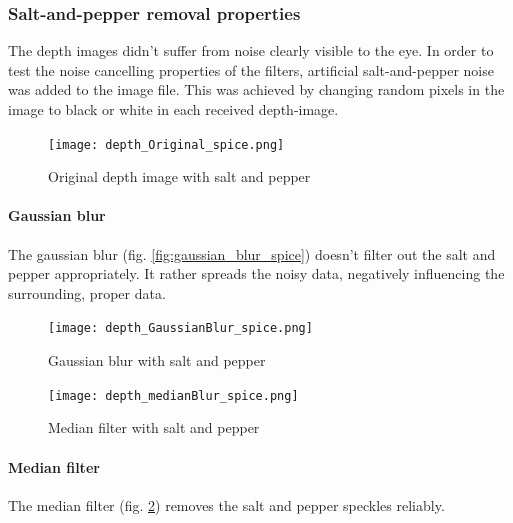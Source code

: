 \documentclass[DIV12,a4paper]{scrartcl}
\begin{document}
\newpage
\subsubsection{Salt-and-pepper removal properties}
\label{sec:grain_removal}
The depth images didn't suffer from noise clearly visible to the eye. In order to test the noise cancelling properties of the filters, artificial salt-and-pepper noise was added to the image file. This was achieved by changing random pixels in the image to black or white in each received depth-image. %
\par
\begin{figure}[h!tbp]
  \centering
  \texttt{[image: depth\_Original\_spice.png]}
  \caption{Original depth image with salt and pepper}
  \label{fig:original_depth_spice}
\end{figure}
\paragraph{Gaussian blur}
The gaussian blur (fig. \ref{fig:gaussian_blur_spice}) doesn't filter out the salt and pepper appropriately. It rather spreads the noisy data, negatively influencing the surrounding, proper data.
\begin{figure}[h!tbp]
  \centering
  \begin{minipage}{.5\textwidth}
    \centering
    \texttt{[image: depth\_GaussianBlur\_spice.png]}
    \caption{Gaussian blur with salt and pepper}
    \label{fig:gaussian_blur_spice}
  \end{minipage}%
  \begin{minipage}{.5\textwidth}
    \centering
    \texttt{[image: depth\_medianBlur\_spice.png]}
    \caption{Median filter with salt and pepper}
    \label{fig:median_depth_spice}
  \end{minipage}
\end{figure}

\paragraph{Median filter}
The median filter (fig. \ref{fig:median_depth_spice}) removes the salt and pepper speckles reliably.
\end{document}
